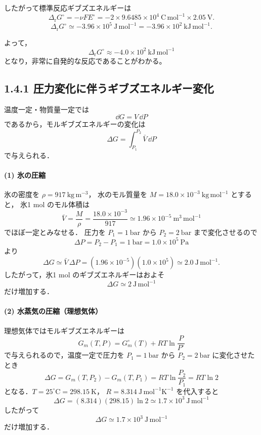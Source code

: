 \documentclass[a4paper,12pt]{jlreq}
\begin{document}
したがって標準反応ギブズエネルギーは
\[
\Delta_{\mathrm r}G^\circ
= -\nu F E^\circ
= -2 \times 9.6485\times10^{4}\ \mathrm{C\,mol^{-1}}
     \times 2.05\ \mathrm{V}.
\]
\[
\Delta_{\mathrm r}G^\circ
\simeq -3.96\times10^{5}\ \mathrm{J\,mol^{-1}}
= -3.96\times10^{2}\ \mathrm{kJ\,mol^{-1}}.
\]

よって，
\[
\boxed{\Delta_{\mathrm r}G^\circ \approx -4.0\times10^{2}\ \mathrm{kJ\,mol^{-1}}}
\]
となり，非常に自発的な反応であることがわかる。









\newpage

\subsection*{1.4.1 圧力変化に伴うギブズエネルギー変化}

温度一定・物質量一定では
\[
 \dd G = V\,\dd P
\]
であるから，モルギブズエネルギーの変化は
\[
 \Delta G = \int_{P_1}^{P_2} \bar V\,\dd P
\]
で与えられる．

\paragraph{(1) 氷の圧縮}

氷の密度を $\rho = 917\ \mathrm{kg\,m^{-3}}$，
水のモル質量を $M=18.0\times 10^{-3}\ \mathrm{kg\,mol^{-1}}$ とすると，
氷1 mol のモル体積は
\[
 \bar V = \frac{M}{\rho}
      = \frac{18.0\times10^{-3}}{917}
      \simeq 1.96\times10^{-5}\ \mathrm{m^3\,mol^{-1}}
\]
でほぼ一定とみなせる．  
圧力を $P_1=1\ \mathrm{bar}$ から $P_2=2\ \mathrm{bar}$ まで変化させるので
\[
 \Delta P = P_2-P_1 = 1\ \mathrm{bar}
          = 1.0\times10^{5}\ \mathrm{Pa}
\]
より
\[
 \Delta G
 \simeq \bar V\,\Delta P
 = (1.96\times10^{-5})(1.0\times10^{5})
 \simeq 2.0\ \mathrm{J\,mol^{-1}}.
\]
したがって，氷1 mol のギブズエネルギーはおよそ
\[
 \boxed{\Delta G \simeq 2\ \mathrm{J\,mol^{-1}}}
\]
だけ増加する．

\paragraph{(2) 水蒸気の圧縮（理想気体）}

理想気体ではモルギブズエネルギーは
\[
 G_m(T,P) = G_m^\circ(T) + RT\ln\frac{P}{P^\circ}
\]
で与えられるので，温度一定で圧力を
$P_1=1\ \mathrm{bar}$ から $P_2=2\ \mathrm{bar}$ に変化させたとき
\[
 \Delta G = G_m(T,P_2)-G_m(T,P_1)
          = RT\ln\frac{P_2}{P_1}
          = RT\ln2
\]
となる．$T=25^\circ\mathrm{C}=298.15\ \mathrm{K}$，
$R=8.314\ \mathrm{J\,mol^{-1}K^{-1}}$ を代入すると
\[
 \Delta G
 = (8.314)(298.15)\ln2
 \simeq 1.7\times10^{3}\ \mathrm{J\,mol^{-1}}
\]
したがって
\[
 \boxed{\Delta G \simeq 1.7\times10^{3}\ \mathrm{J\,mol^{-1}}}
\]
だけ増加する．
\end{document}
